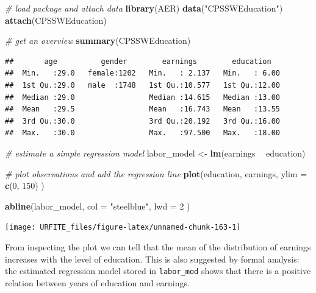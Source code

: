 \documentclass[]{book}
\newenvironment{Shaded}{\begin{snugshade}}{\end{snugshade}}
\newcommand{\KeywordTok}[1]{\textcolor[rgb]{0.13,0.29,0.53}{\textbf{#1}}}
\newcommand{\DataTypeTok}[1]{\textcolor[rgb]{0.13,0.29,0.53}{#1}}
\newcommand{\DecValTok}[1]{\textcolor[rgb]{0.00,0.00,0.81}{#1}}
\newcommand{\StringTok}[1]{\textcolor[rgb]{0.31,0.60,0.02}{#1}}
\newcommand{\CommentTok}[1]{\textcolor[rgb]{0.56,0.35,0.01}{\textit{#1}}}
\newcommand{\OperatorTok}[1]{\textcolor[rgb]{0.81,0.36,0.00}{\textbf{#1}}}
\newcommand{\NormalTok}[1]{#1}
\theoremstyle{definition}
\theoremstyle{definition}
\theoremstyle{definition}
\theoremstyle{remark}
\begin{document}
\begin{Shaded}
\begin{Highlighting}[]
\CommentTok{# load package and attach data}
\KeywordTok{library}\NormalTok{(AER)}
\KeywordTok{data}\NormalTok{(}\StringTok{"CPSSWEducation"}\NormalTok{)}
\KeywordTok{attach}\NormalTok{(CPSSWEducation)}

\CommentTok{# get an overview}
\KeywordTok{summary}\NormalTok{(CPSSWEducation)}
\end{Highlighting}
\end{Shaded}

\begin{verbatim}
##       age          gender        earnings        education    
##  Min.   :29.0   female:1202   Min.   : 2.137   Min.   : 6.00  
##  1st Qu.:29.0   male  :1748   1st Qu.:10.577   1st Qu.:12.00  
##  Median :29.0                 Median :14.615   Median :13.00  
##  Mean   :29.5                 Mean   :16.743   Mean   :13.55  
##  3rd Qu.:30.0                 3rd Qu.:20.192   3rd Qu.:16.00  
##  Max.   :30.0                 Max.   :97.500   Max.   :18.00
\end{verbatim}

\begin{Shaded}
\begin{Highlighting}[]
\CommentTok{# estimate a simple regression model}
\NormalTok{labor_model <-}\StringTok{ }\KeywordTok{lm}\NormalTok{(earnings }\OperatorTok{~}\StringTok{ }\NormalTok{education)}

\CommentTok{# plot observations and add the regression line}
\KeywordTok{plot}\NormalTok{(education, }
\NormalTok{     earnings, }
     \DataTypeTok{ylim =} \KeywordTok{c}\NormalTok{(}\DecValTok{0}\NormalTok{, }\DecValTok{150}\NormalTok{)}
\NormalTok{     )}

\KeywordTok{abline}\NormalTok{(labor_model, }
       \DataTypeTok{col =} \StringTok{"steelblue"}\NormalTok{, }
       \DataTypeTok{lwd =} \DecValTok{2}
\NormalTok{       )}
\end{Highlighting}
\end{Shaded}

\begin{center}\texttt{[image: URFITE\_files/figure-latex/unnamed-chunk-163-1]} \end{center}

From inspecting the plot we can tell that the mean of the distribution
of earnings increases with the level of education. This is also
suggested by formal analysis: the estimated regression model stored in
\texttt{labor\_mod} shows that there is a positive relation between
years of education and earnings.
\end{document}
